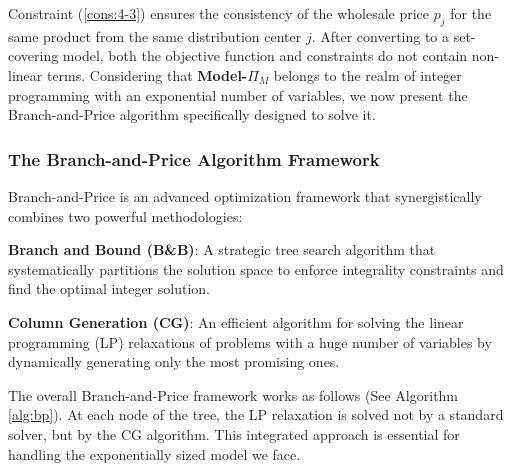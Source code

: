 \documentclass[]{article}
\theoremstyle{plain}%
\theoremstyle{definition}
\theoremstyle{remark}
\theoremstyle{plain}%
\begin{document}
    Constraint (\ref{cons:4-3}) ensures the consistency of the wholesale price $p_j$ for the same product from the same distribution center $j$. After converting to a set-covering model, both the objective function and constraints do not contain non-linear terms. Considering that \textbf{Model-}$\Pi_M$ belongs to the realm of integer programming with an exponential number of variables, we now present the Branch-and-Price algorithm specifically designed to solve it.
    
    \subsubsection{The Branch-and-Price Algorithm Framework}
    
    Branch-and-Price is an advanced optimization framework that synergistically combines two powerful methodologies:
    
    \textbf{Branch and Bound (B\&B)}: A strategic tree search algorithm that systematically partitions the solution space to enforce integrality constraints and find the optimal integer solution.
    
    \textbf{Column Generation (CG)}: An efficient algorithm for solving the linear programming (LP) relaxations of problems with a huge number of variables by dynamically generating only the most promising ones.
    
    The overall Branch-and-Price framework works as follows (See Algorithm \ref{alg:bp}). At each node of the tree, the LP relaxation is solved not by a standard solver, but by the CG algorithm. This integrated approach is essential for handling the exponentially sized model we face.
    
\end{document}
